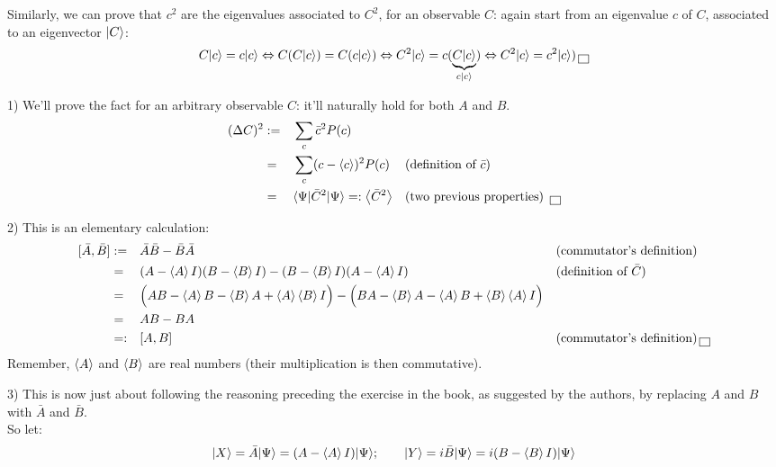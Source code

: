 \documentclass[solutions.tex]{subfiles}
\begin{document}
\hrr

Similarly, we can prove that $c^2$ are the eigenvalues associated
to $C^2$, for an observable $C$: again start from an eigenvalue
$c$ of $C$, associated to an eigenvector $|C\rangle$:
\[
	C|c\rangle = c|c\rangle
	\Leftrightarrow C(C|c\rangle) = C(c|c\rangle)
	\Leftrightarrow C^2|c\rangle = c(\underbrace{C|c\rangle}_{c|c\rangle})
	\Leftrightarrow C^2|c\rangle = c^2|c\rangle) \,\boxed{\,}
\]

\hrr

1) We'll prove the fact for an arbitrary observable $C$: it'll
naturally hold for both $A$ and $B$.
\begin{equation*}\begin{aligned}
	(\Delta C)^2 &:=&& \sum_c \bar{c}^2P(c) && ~ \\
	~ &=&& \sum_c (c-\left<c\right>)^2P(c) && \text{(definition of $\bar{c}$)} \\
	~ &=&& \langle \Psi|\bar{C}^2|\Psi\rangle =: \left\langle \bar{C}^2 \right\rangle && \text{(two previous properties) \,\boxed{\,}} \\
\end{aligned}\end{equation*}

\hrr

2) This is an elementary calculation:
\begin{equation*}\begin{aligned}
	[\bar{A}, \bar{B}] &:=&& \bar{A}\bar{B} - \bar{B}\bar{A}
		&& \text{(commutator's definition)} \\
	~ &=&& (A-\avg{A}I)(B-\avg{B}I) - (B-\avg{B}I)(A-\avg{A}I)
		&& \text{(definition of $\bar{C}$)} \\
	~ &=&& \Big(AB - \avg{A}B -\avg{B}A + \avg{A}\avg{B}I\Big)
		- \Big(BA -\avg{B}A - \avg{A}B + \avg{B}\avg{A}I\Big) && ~ \\
	~ &=&& AB - BA && ~ \\
	~ &=:&& [A, B] && \text{(commutator's definition)} \qed \\
\end{aligned}\end{equation*}
Remember, $\left\langle A \right\rangle$ and $\left\langle B \right\rangle$ are real numbers (their multiplication
is then commutative).

\hrr

3) This is now just about following the reasoning preceding
the exercise in the book, as suggested by the authors, by
replacing $A$ and $B$ with $\bar{A}$ and $\bar{B}$. \\

So let:
\[
	|X\rangle = \bar{A}|\Psi\rangle = (A-\left\langle A \right\rangle I)|\Psi\rangle;\qquad
	|Y\rangle = i\bar{B}|\Psi\rangle= i(B-\left\langle B \right\rangle I)|\Psi\rangle
\]
\end{document}
